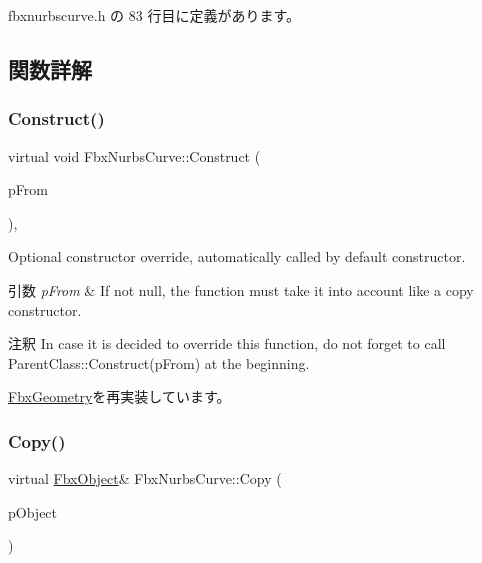  fbxnurbscurve.\+h の 83 行目に定義があります。



\subsection{関数詳解}
\mbox{\label{class_fbx_nurbs_curve_ac730e9ec1d56724f8495725b0491ddd8}} 
\subsubsection{\texorpdfstring{Construct()}{Construct()}}
{\footnotesize\ttfamily virtual void Fbx\+Nurbs\+Curve\+::\+Construct (\begin{DoxyParamCaption}\item[{const \hyperlink{class_fbx_object}{Fbx\+Object} $\ast$}]{p\+From }\end{DoxyParamCaption})\hspace{0.3cm}{\ttfamily [protected]}, {\ttfamily [virtual]}}

Optional constructor override, automatically called by default constructor. 
\begin{DoxyParams}{引数}
{\em p\+From} & If not null, the function must take it into account like a copy constructor. \\
\hline
\end{DoxyParams}
\begin{DoxyRemark}{注釈}
In case it is decided to override this function, do not forget to call Parent\+Class\+::\+Construct(p\+From) at the beginning. 
\end{DoxyRemark}


\hyperlink{class_fbx_geometry_a26ca96a86f17783c45ff83b33d2b5324}{Fbx\+Geometry}を再実装しています。

\mbox{\label{class_fbx_nurbs_curve_ad48046242c0a63d929b5440563668f79}} 
\subsubsection{\texorpdfstring{Copy()}{Copy()}}
{\footnotesize\ttfamily virtual \hyperlink{class_fbx_object}{Fbx\+Object}\& Fbx\+Nurbs\+Curve\+::\+Copy (\begin{DoxyParamCaption}\item[{const \hyperlink{class_fbx_object}{Fbx\+Object} \&}]{p\+Object }\end{DoxyParamCaption})\hspace{0.3cm}{\ttfamily [virtual]}}

